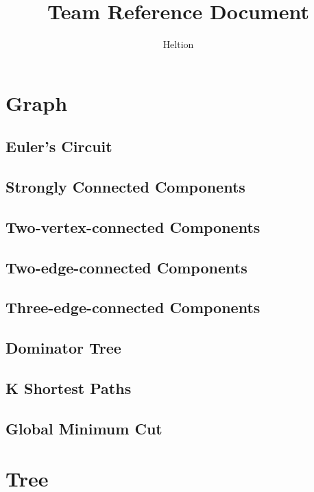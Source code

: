 \documentclass{article}
\begin{document}
\title{Team Reference Document}
\author{Heltion}
\maketitle
\newpage
\begin{multicols}{2}
    \tableofcontents
    \newpage

    \section{Graph}
    \subsection{Euler's Circuit}
    
    \subsection{Strongly Connected Components}
    
    \subsection{Two-vertex-connected Components}
    
    \subsection{Two-edge-connected Components}
    
    \subsection{Three-edge-connected Components}
    
    \subsection{Dominator Tree}
    
    \subsection{K Shortest Paths}
    
    \subsection{Global Minimum Cut}
    

    \section{Tree}

\end{multicols}
\end{document}
